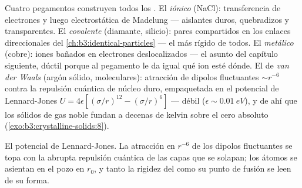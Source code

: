 \begin{remark}\label{rem:b3:crystalline-solids:bonds}
Cuatro pegamentos construyen todos los . El \emph{iónico} (NaCl):
transferencia de electrones y luego electrostática de Madelung --- aislantes duros,
quebradizos y transparentes. El \emph{covalente} (diamante, silicio): pares
compartidos en los enlaces direccionales del
\cref{ch:b3:identical-particles} --- el más rígido de todos.
El \emph{metálico} (cobre): iones bañados en electrones deslocalizados ---
el asunto del capítulo siguiente, dúctil porque al pegamento le da igual
qué ion esté dónde. El de \emph{van der Waals} (argón sólido, 
moleculares): atracción de dipolos fluctuantes $\sim r^{-6}$ contra
la repulsión cuántica de núcleo duro, empaquetada en el potencial de
Lennard-Jones $U = 4\epsilon[(\sigma/r)^{12} - (\sigma/r)^6]$ --- débil
($\epsilon \sim \qty{0.01}{eV}$), y de ahí que los sólidos de gas noble fundan
a decenas de kelvin sobre el cero absoluto
(\cref{exo:b3:crystalline-solids:8}).
\end{remark}

\begin{omfigure}

{\small El potencial de Lennard-Jones. La atracción en $r^{-6}$ de los
dipolos fluctuantes se topa con la abrupta repulsión cuántica de las
capas que se solapan; los átomos se asientan en el pozo en $r_0$, y tanto la
rigidez del  como su punto de fusión se leen de su forma.}
\end{omfigure}

